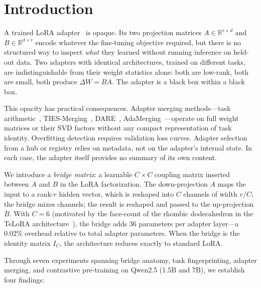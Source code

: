 
\section{Introduction}
\label{sec:introduction}

A trained LoRA adapter~\cite{hu2022lora} is opaque.
Its two projection matrices $A \in \mathbb{R}^{r \times d}$ and
$B \in \mathbb{R}^{d \times r}$ encode whatever the fine-tuning
objective required, but there is no structured way to inspect
\emph{what} they learned without running inference on held-out data.
Two adapters with identical architectures, trained on different tasks,
are indistinguishable from their weight statistics alone: both are
low-rank, both are small, both produce $\Delta W = BA$.
The adapter is a black box within a black box.

This opacity has practical consequences.
Adapter merging methods---task arithmetic~\cite{ilharco2023editing},
TIES-Merging~\cite{yadav2023ties}, DARE~\cite{yu2024dare},
AdaMerging~\cite{yang2024adamerging}---operate on full weight matrices
or their SVD factors without any compact representation of task identity.
Overfitting detection requires validation loss curves.
Adapter selection from a hub or registry relies on metadata, not on the
adapter's internal state.
In each case, the adapter itself provides no summary of its own content.

We introduce a \emph{bridge matrix}: a learnable $C \times C$ coupling
matrix inserted between $A$ and $B$ in the LoRA factorization.
The down-projection $A$ maps the input to a rank-$r$ hidden vector,
which is reshaped into $C$ channels of width $r/C$; the bridge mixes
channels; the result is reshaped and passed to the up-projection $B$.
With $C = 6$ (motivated by the face-count of the rhombic dodecahedron
in the TeLoRA architecture~\cite{rhombilora_paper1, rhombilora_paper2}),
the bridge adds 36 parameters per adapter layer---a $0.02\%$ overhead
relative to total adapter parameters.
When the bridge is the identity matrix $I_C$, the architecture
reduces exactly to standard LoRA.

Through seven experiments spanning bridge anatomy, task fingerprinting,
adapter merging, and contrastive pre-training on Qwen2.5 (1.5B and 7B),
we establish four findings:

